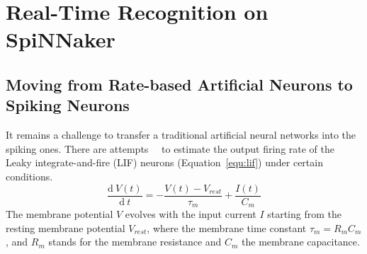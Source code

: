 \documentclass[journal]{journal}
\def\D{\mathrm{d}}
\begin{document}
\section{Real-Time Recognition on SpiNNaker}

\subsection{Moving from Rate-based Artificial Neurons to Spiking Neurons}
It remains a challenge to transfer a traditional artificial neural networks into the spiking ones.
There are attempts~\cite{la2008response}~\cite{burkitt2006review} to estimate the output firing rate of the Leaky integrate-and-fire (LIF) neurons (Equation~\ref{equ:lif}) under certain conditions. 
\begin{equation}
\frac{\D \: V(t)}{\D\:  t}=-\frac{V(t)-V_\mathit{rest}}{\tau_m}+\frac{I(t)}{C_m}
\label{equ:lif}
\end{equation}
The membrane potential $V$ evolves with the input current $I$ starting from the resting membrane potential  $V_{rest}$, where the membrane time constant $\tau_m = R_mC_m$, and $R_m$ stands for the membrane resistance and $C_m$ the membrane capacitance.
\end{document}
